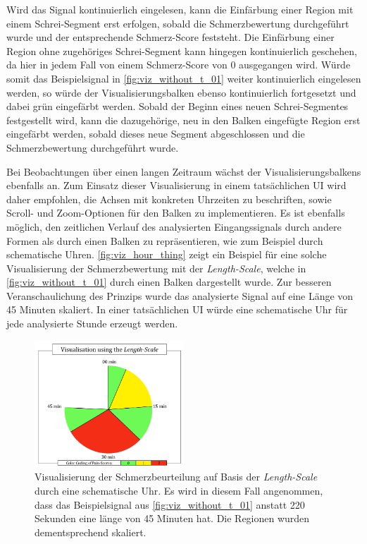 Wird das Signal kontinuierlich eingelesen, kann die Einfärbung einer Region mit einem Schrei-Segment erst erfolgen, sobald die Schmerzbewertung durchgeführt wurde und der entsprechende Schmerz-Score feststeht. Die Einfärbung einer Region ohne zugehöriges Schrei-Segment kann hingegen kontinuierlich geschehen, da hier in jedem Fall von einem Schmerz-Score von 0 ausgegangen wird. Würde somit das Beispielsignal in \autoref{fig:viz_without_t_01} weiter kontinuierlich eingelesen werden, so würde der Visualisierungsbalken ebenso kontinuierlich fortgesetzt und dabei grün eingefärbt werden. Sobald der Beginn eines neuen Schrei-Segmentes festgestellt wird, kann die dazugehörige, neu in den Balken eingefügte Region erst eingefärbt werden, sobald dieses neue Segment abgeschlossen und die Schmerzbewertung durchgeführt wurde.

Bei Beobachtungen über einen langen Zeitraum wächst der Visualisierungsbalkens ebenfalls an. Zum Einsatz dieser Visualisierung in einem tatsächlichen UI wird daher empfohlen, die Achsen mit konkreten Uhrzeiten zu beschriften, sowie Scroll- und Zoom-Optionen für den Balken zu implementieren. Es ist ebenfalls möglich, den zeitlichen Verlauf des analysierten Eingangssignals durch andere Formen als durch einen Balken zu repräsentieren, wie zum Beispiel durch schematische Uhren. \autoref{fig:viz_hour_thing} zeigt ein Beispiel für eine solche Visualisierung der Schmerzbewertung mit der \emph{Length-Scale}, welche in \autoref{fig:viz_without_t_01} durch einen Balken dargestellt wurde. Zur besseren Veranschaulichung des Prinzips wurde das analysierte Signal auf eine Länge von 45 Minuten skaliert. In einer tatsächlichen UI würde eine schematische Uhr für jede analysierte Stunde erzeugt werden.

\begin{figure}[h]
	\centering
	\includegraphics[width=0.5\textwidth]{bilder/visualisation_hour_02.png}
	\caption[Visualisierung der Schmerzbeurteilung durch eine schematische Uhr]{Visualisierung der Schmerzbeurteilung auf Basis der \emph{Length-Scale} durch eine schematische Uhr. Es wird in diesem Fall angenommen, dass das Beispielsignal aus \autoref{fig:viz_without_t_01} anstatt 220 Sekunden eine länge von 45 Minuten hat. Die Regionen wurden dementsprechend skaliert.}
	\label{fig:viz_hour_thing}
\end{figure}


